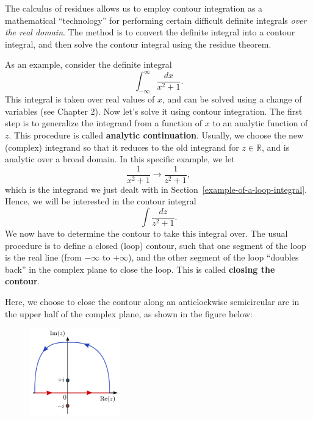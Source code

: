 \documentclass[10pt,a4paper]{article}
\begin{document}
The calculus of residues allows us to employ contour integration as a
mathematical ``technology'' for performing certain difficult definite
integrals \emph{over the real domain}. The method is to convert the
definite integral into a contour integral, and then solve the contour
integral using the residue theorem.

As an example, consider the definite integral
\begin{equation}
\int_{-\infty}^\infty \frac{dx}{x^2 + 1}.
\end{equation}
This integral is taken over real values of $x$, and can be solved
using a change of variables (see Chapter 2). Now let's solve it using
contour integration. The first step is to generalize the integrand
from a function of $x$ to an analytic function of $z$. This procedure
is called \textbf{analytic continuation}. Usually, we choose the new
(complex) integrand so that it reduces to the old integrand for $z \in
\mathbb{R}$, and is analytic over a broad domain. In this specific
example, we let
\begin{equation}
\frac{1}{x^2 + 1} \rightarrow \frac{1}{z^2 + 1},
\end{equation}
which is the integrand we just dealt with in
Section~\ref{example-of-a-loop-integral}. Hence, we will be interested
in the contour integral
\begin{equation}
\int \frac{dz}{z^2 + 1}.
\end{equation}
We now have to determine the contour to take this integral over. The
usual procedure is to define a closed (loop) contour, such that one
segment of the loop is the real line (from $-\infty$ to $+\infty$),
and the other segment of the loop ``doubles back'' in the complex plane
to close the loop. This is called \textbf{closing the contour}.

Here, we choose to close the contour along an anticlockwise semicircular
arc in the upper half of the complex plane, as shown in the figure
below:

\begin{figure}[h]
  \centering\includegraphics[width=0.35\textwidth]{contour_example2}
\end{figure}
\end{document}
